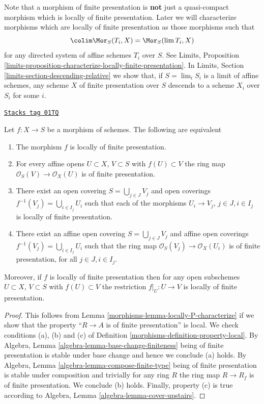 Note that a morphism of finite presentation is {\bf not} just a quasi-compact
morphism which is locally of finite presentation.
Later we will characterize morphisms which are
locally of finite presentation as those morphisms such that
$$
\colim \Mor_S(T_i, X) = \Mor_S(\lim T_i, X)
$$
for any directed system of affine schemes $T_i$ over $S$. See
Limits,
Proposition \ref{limits-proposition-characterize-locally-finite-presentation}.
In Limits, Section \ref{limits-section-descending-relative} we show
that, if $S = \lim_i S_i$ is a limit of affine schemes,
any scheme $X$ of finite presentation over $S$ descends to a scheme
$X_i$ over $S_i$ for some $i$.

\begin{lemma}
\label{morphisms-lemma-locally-finite-presentation-characterize}
\href{https://stacks.math.columbia.edu/tag/01TQ}{\texttt{Stacks tag 01TQ}}

Let $f : X \to S$ be a morphism of schemes.
The following are equivalent
\begin{enumerate}
\item The morphism $f$ is locally of finite presentation.
\item For every affine opens $U \subset X$, $V \subset S$
with $f(U) \subset V$ the ring map
$\mathcal{O}_S(V) \to \mathcal{O}_X(U)$ is of finite presentation.
\item There exist an open covering $S = \bigcup_{j \in J} V_j$
and open coverings $f^{-1}(V_j) = \bigcup_{i \in I_j} U_i$ such
that each of the morphisms $U_i \to V_j$, $j\in J, i\in I_j$
is locally of finite presentation.
\item There exist an affine open covering $S = \bigcup_{j \in J} V_j$
and affine open coverings $f^{-1}(V_j) = \bigcup_{i \in I_j} U_i$ such
that the ring map $\mathcal{O}_S(V_j) \to \mathcal{O}_X(U_i)$ is
of finite presentation, for all $j\in J, i\in I_j$.
\end{enumerate}
Moreover, if $f$ is locally of finite presentation then for
any open subschemes $U \subset X$, $V \subset S$ with $f(U) \subset V$
the restriction $f|_U : U \to V$ is locally of finite presentation.
\end{lemma}

\begin{proof}

This follows from Lemma \ref{morphisms-lemma-locally-P-characterize} if we show that
the property ``$R \to A$ is of finite presentation'' is local.
We check conditions (a), (b) and (c) of Definition
\ref{morphisms-definition-property-local}.
By Algebra, Lemma \ref{algebra-lemma-base-change-finiteness}
being of finite presentation is stable under base change and hence
we conclude (a) holds. By Algebra, Lemma
\ref{algebra-lemma-compose-finite-type} being of finite presentation
is stable under composition and trivially for any ring
$R$ the ring map $R \to R_f$ is of finite presentation.
We conclude (b) holds. Finally, property (c) is true
according to Algebra, Lemma \ref{algebra-lemma-cover-upstairs}.
\end{proof}

